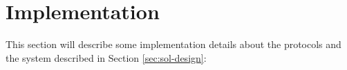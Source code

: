 \section{Implementation}\label{sec:implementation}

This section will describe some implementation details about
the protocols and the system described in Section \ref{sec:sol-design}:









